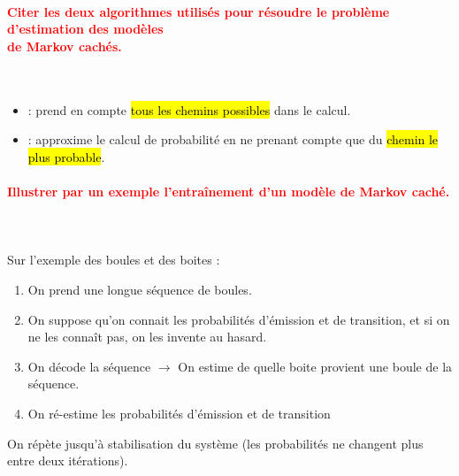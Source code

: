 \documentclass[letterpaper, 12pt]{article}
\newcommand{\red}[1]{
	\textcolor{red}{#1}
}
\newcommand{\myul}[1]{
	\underline{\smash{#1}}
}
\begin{document}
		\paragraph{\red{Citer les deux algorithmes utilisés pour résoudre le problème d'estimation des modèles 
		~\\ \hspace*{0.035cm} de Markov cachés.}}~\\
			\vspace*{-0.45cm}
			\begin{itemize}
				\setlength{\itemsep}{0pt}		
				\setlength{\parskip}{0pt}		
				\setlength{\parsep}{0pt}	
				\item \myul{Baum-Welch}: prend en compte \hl{tous les chemins possibles} dans le calcul.
				\item \myul{Viterbi}: approxime le calcul de probabilité en ne prenant compte que du \hl{chemin 
					le plus probable}.
			\end{itemize}		
		\paragraph{\red{Illustrer par un exemple l'entraînement d'un modèle de Markov caché.}}~\\~\\
			Sur l'exemple des boules et des boites : 
			\begin{enumerate}
				\setlength{\itemsep}{0pt}		
				\setlength{\parskip}{0pt}		
				\setlength{\parsep}{0pt}	
				\item On prend une longue séquence de boules.
				\item On suppose qu'on connait les probabilités d'émission et de transition, et si on ne les 
					connaît pas, on les invente au hasard.
				\item On décode la séquence $\rightarrow$ On estime de quelle boite provient une boule de la 
					séquence.
				\item On ré-estime les probabilités d'émission et de transition
			\end{enumerate}
			On répète jusqu'à stabilisation du système (les probabilités ne changent plus entre deux itérations).
\end{document}
